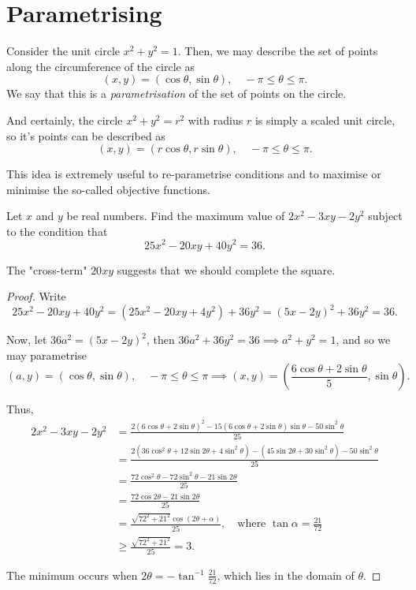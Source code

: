 \documentclass[../jarvis.tex]{subfiles}
\begin{document}
\section{Parametrising \med}
Consider the unit circle $x^2+y^2=1$. Then, we may describe the set of points along the circumference of the circle as
$$(x,y)=(\cos\theta, \sin\theta), \quad -\pi\leq\theta\leq\pi.$$
We say that this is a \textit{parametrisation} of the set of points on the circle.

And certainly, the circle $x^2+y^2=r^2$ with radius $r$ is simply a scaled unit circle, so it's points can be described as
$$(x,y)=(r\cos\theta, r\sin\theta), \quad -\pi\leq\theta\leq\pi.$$

This idea is extremely useful to re-parametrise conditions and to maximise or minimise the so-called objective functions.
\begin{example}[2018 SMO(S) P11]
    Let $x$ and $y$ be real numbers. Find the maximum value of $2x^2-3xy-2y^2$ subject to the condition that
    $$25x^2-20xy+40y^2=36.$$
\end{example}
The "cross-term" $20xy$ suggests that we should complete the square. 


\begin{proof}
    Write $$25x^2-20xy+40y^2=(25x^2-20xy+4y^2)+36y^2=(5x-2y)^2+36y^2=36.$$
    
    Now, let $36a^2=(5x-2y)^2$, then $36a^2+36y^2=36 \implies a^2+y^2=1$, and so we may parametrise 
    $$(a,y)=(\cos\theta,\sin\theta),\quad -\pi\leq\theta\leq\pi \implies (x,y)=\left(\frac{6\cos\theta+2\sin\theta}{5}, \sin\theta\right).$$
    
    Thus, \begin{align*}
        2x^2-3xy-2y^2&=\frac{2(6\cos\theta+2\sin\theta)^2-15(6\cos\theta+2\sin\theta)\sin\theta-50\sin^2\theta}{25} \\
        &=\frac{2(36\cos^2\theta+12\sin 2\theta+4\sin^2\theta)-(45\sin2\theta+30\sin^2\theta)-50\sin^2\theta}{25} \\
        &=\frac{72\cos^2\theta-72\sin^2\theta-21\sin2\theta}{25} \\
        &=\frac{72\cos2\theta-21\sin2\theta}{25} \\
        &=\frac{\sqrt{72^2+21^2}\cos(2\theta+\alpha)}{25}, \quad \text{where }\tan\alpha=\frac{21}{72} \\
        &\geq\frac{\sqrt{72^2+21^2}}{25}=\boxed{3}.
    \end{align*}
    
    The minimum occurs when $2\theta=-\tan^{-1}\frac{21}{72}$, which lies in the domain of $\theta$.
\end{proof}
\end{document}
